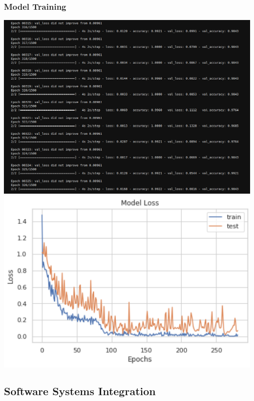\documentclass[11pt, hidelinks]{report}
\begin{document}
\subsubsection{Model Training} \label{app:model}
	\begin{center}
	     \includegraphics[scale=0.45]{training_epochs.png}
	     \includegraphics[scale=0.9]{chart.png}
	\end{center}


\subsection{Software Systems Integration} \label{app:system}
\end{document}
